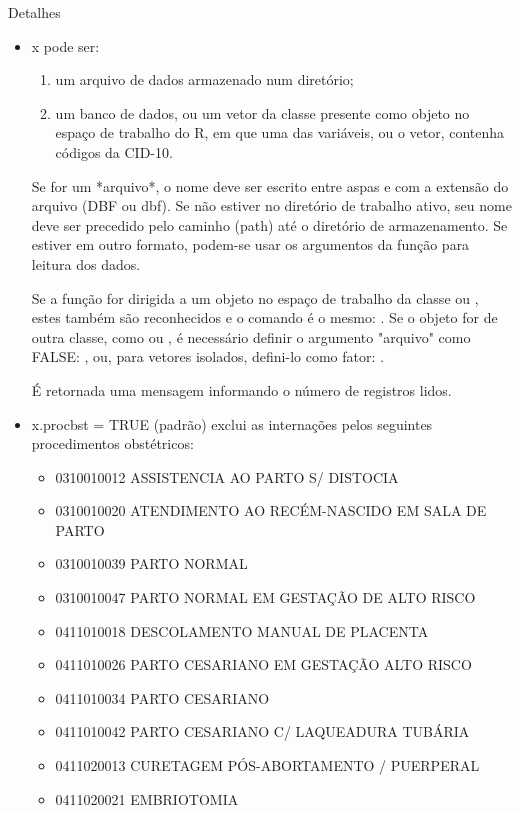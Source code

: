 \documentclass[letterpaper]{book}
\begin{document}
\begin{Section}{Detalhes}
\begin{itemize}
\item x pode ser: 
\begin{enumerate}
 \item  um arquivo de dados armazenado num diretório;  
\item  um banco de dados, ou um vetor da classe  presente como objeto no espaço de trabalho do R, em que uma das variáveis, ou o vetor, contenha códigos da CID-10. 
\end{enumerate}

Se for um *arquivo*, o nome deve ser escrito entre aspas e com a extensão do arquivo (DBF ou dbf). Se não estiver no diretório de trabalho ativo, seu nome deve ser precedido pelo caminho (path) até o diretório de armazenamento. Se estiver em outro formato, podem-se usar os argumentos da função  para leitura dos dados.

Se a função for dirigida a um objeto no espaço de trabalho da classe  ou , estes também são reconhecidos e o comando é o mesmo: . Se o objeto for de outra classe, como  ou , é necessário definir o argumento "arquivo" como FALSE: , ou, para vetores isolados, defini-lo como fator: .

É retornada uma mensagem informando o número de registros lidos.

\item x.procbst  = TRUE (padrão) exclui as internações pelos seguintes procedimentos obstétricos:
\begin{itemize}
\item 0310010012  ASSISTENCIA AO PARTO S/ DISTOCIA
\item 0310010020  ATENDIMENTO AO RECÉM-NASCIDO EM SALA DE PARTO
\item 0310010039  PARTO NORMAL
\item 0310010047  PARTO NORMAL EM GESTAÇÃO DE ALTO RISCO 
\item 0411010018  DESCOLAMENTO MANUAL DE PLACENTA
\item 0411010026  PARTO CESARIANO EM GESTAÇÃO ALTO RISCO
\item 0411010034  PARTO CESARIANO
\item 0411010042  PARTO CESARIANO C/ LAQUEADURA TUBÁRIA
\item 0411020013  CURETAGEM PÓS-ABORTAMENTO / PUERPERAL
\item 0411020021  EMBRIOTOMIA
\end{itemize}


\end{itemize}
\end{Section}
\end{document}
